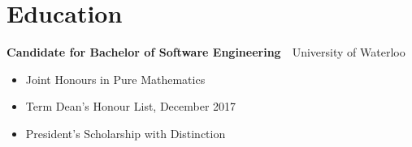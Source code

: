 \documentclass[oneside, 11pt]{memoir}
\newcommand{\entryGeneral}[4]{
  \begin{adjustwidth}{0.3em}{0em}%
  \textbf{#1}~\cdot~#2\sourceatright{\Date \small #3}%
  \begin{adjustwidth}{0.5em}{2.5em}
    \begin{flushleft}
      {\Merriweather \small #4}%
    \end{flushleft}
  \end{adjustwidth}
  \end{adjustwidth}
}
\begin{document}
\section*{Education}
\entryGeneral{Candidate for Bachelor of Software Engineering}{University of Waterloo}{2022}{
    \begin{itemize}
        \itemsep 0.3em
        \item{
            Joint Honours in Pure Mathematics
        }
        \item{
            Term Dean’s Honour List, December 2017
        }
        \item{
            President’s Scholarship with Distinction
        }
    \end{itemize}
}

%
\end{document}
